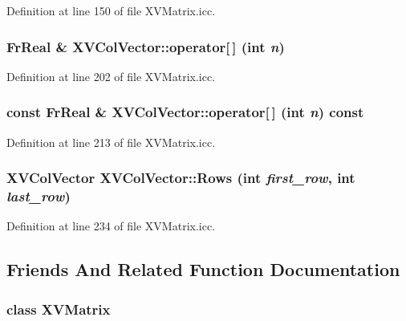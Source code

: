Definition at line 150 of file XVMatrix.icc.\label{XVColVector_a5}
\hypertarget{class_XVColVector_a5}{
\subsubsection[operator{}]{\setlength{\rightskip}{0pt plus 5cm}Fr\-Real \& XVCol\-Vector::operator\mbox{[}$\,$\mbox{]} (int {\em n})}}




Definition at line 202 of file XVMatrix.icc.\label{XVColVector_a6}
\hypertarget{class_XVColVector_a6}{
\subsubsection[operator{}]{\setlength{\rightskip}{0pt plus 5cm}const Fr\-Real \& XVCol\-Vector::operator\mbox{[}$\,$\mbox{]} (int {\em n}) const}}




Definition at line 213 of file XVMatrix.icc.\label{XVColVector_a16}
\hypertarget{class_XVColVector_a16}{
\subsubsection[Rows]{\setlength{\rightskip}{0pt plus 5cm}XVCol\-Vector XVCol\-Vector::Rows (int {\em first\_\-row}, int {\em last\_\-row})}}




Definition at line 234 of file XVMatrix.icc.

\subsection{Friends And Related Function Documentation}
\label{XVColVector_l0}
\hypertarget{class_XVColVector_l0}{
\subsubsection[XVMatrix]{\setlength{\rightskip}{0pt plus 5cm}class XVMatrix}}




